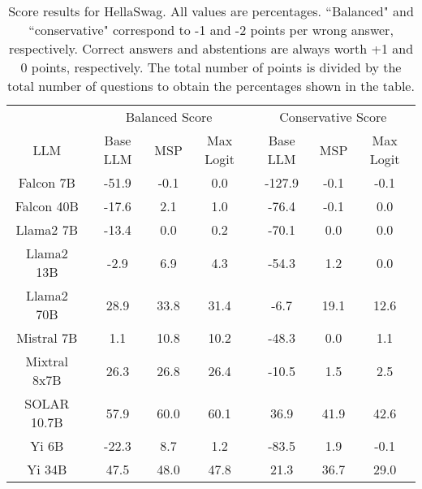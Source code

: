 \begin{table*}
\centering
\begin{tabular}{c|c|c|c|c|c|c}
& \multicolumn{3}{c|}{Balanced Score} & \multicolumn{3}{c}{Conservative Score} \\ 
LLM & Base LLM & MSP & Max Logit & Base LLM & MSP & Max Logit\\ \hline
Falcon 7B & -51.9 & -0.1 & 0.0 & -127.9 & -0.1 & -0.1\\
Falcon 40B & -17.6 & 2.1 & 1.0 & -76.4 & -0.1 & 0.0\\
Llama2 7B & -13.4 & 0.0 & 0.2 & -70.1 & 0.0 & 0.0\\
Llama2 13B & -2.9 & 6.9 & 4.3 & -54.3 & 1.2 & 0.0\\
Llama2 70B & 28.9 & 33.8 & 31.4 & -6.7 & 19.1 & 12.6\\
Mistral 7B & 1.1 & 10.8 & 10.2 & -48.3 & 0.0 & 1.1\\
Mixtral 8x7B & 26.3 & 26.8 & 26.4 & -10.5 & 1.5 & 2.5\\
SOLAR 10.7B & 57.9 & 60.0 & 60.1 & 36.9 & 41.9 & 42.6\\
Yi 6B & -22.3 & 8.7 & 1.2 & -83.5 & 1.9 & -0.1\\
Yi 34B & 47.5 & 48.0 & 47.8 & 21.3 & 36.7 & 29.0\\
\hline
\end{tabular}
\caption{Score results for HellaSwag. All values are percentages. ``Balanced" and ``conservative" correspond to -1 and -2 points per wrong answer, respectively. Correct answers and abstentions are always worth +1 and 0 points, respectively. The total number of points is divided by the total number of questions to obtain the percentages shown in the table.}
\label{tab:hellaswag_score}
\end{table*}
